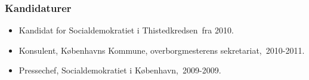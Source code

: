 \documentclass[11pt, a4paper]{awesome-cv}
\begin{document}
\begin{cvletter}
\subsubsection*{Kandidaturer}
\begin{itemize}
\item Kandidat for Socialdemokratiet i Thistedkredsen fra 2010.
\end{itemize}
\begin{itemize}
\item Konsulent, Københavns Kommune, overborgmesterens sekretariat, 2010-2011.
\item Pressechef, Socialdemokratiet i København, 2009-2009.
\end{itemize}
\end{cvletter}
\end{document}
